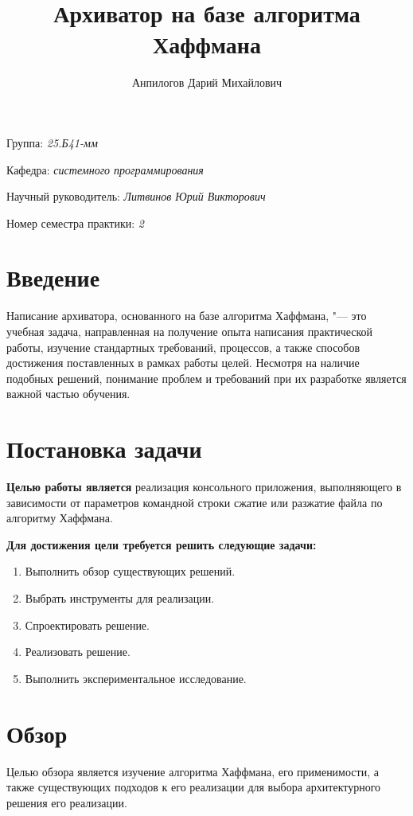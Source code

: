 \documentclass[a4paper]{article}
\title{Архиватор на базе алгоритма Хаффмана}
\author{Анпилогов Дарий Михайлович}
\date{}
\begin{document}
\maketitle

\begin{flushright}
    Группа: \emph{25.Б41-мм}

    Кафедра: \emph{системного программирования}

    Научный руководитель: \emph{Литвинов Юрий Викторович}

    Номер семестра практики: \emph{2}
\end{flushright}

\section{Введение}

Написание архиватора, основанного на базе алгоритма Хаффмана, "--- это учебная задача, направленная на получение опыта написания практической работы, изучение стандартных требований, процессов, а также способов достижения поставленных в рамках работы целей.
Несмотря на наличие подобных решений, понимание проблем и требований при их разработке является важной частью обучения.

\section{Постановка задачи}

\textbf{Целью работы является} реализация консольного приложения, выполняющего в зависимости от параметров командной строки сжатие или разжатие файла по алгоритму Хаффмана.

\textbf{Для достижения цели требуется решить следующие задачи:}
\begin{enumerate}
    \item Выполнить обзор существующих решений.
    \item Выбрать инструменты для реализации.
    \item Спроектировать решение.
    \item Реализовать решение.
    \item Выполнить экспериментальное исследование.
\end{enumerate}

\section{Обзор}

Целью обзора является изучение алгоритма Хаффмана, его применимости, а также существующих подходов к его реализации для выбора архитектурного решения его реализации.
\end{document}
